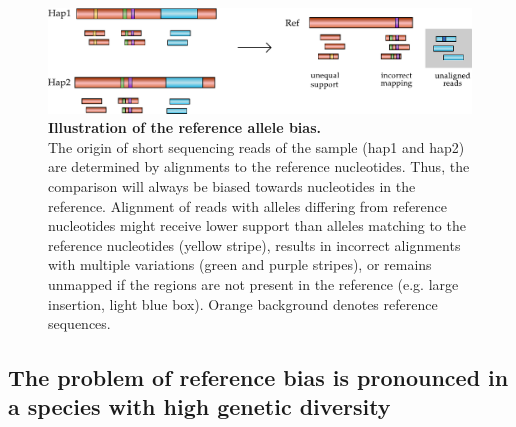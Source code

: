 \documentclass[../main.tex]{subfiles}
\begin{document}
\bigskip

\begin{figure}[!htb]
    \centering
    \includegraphics[width=\textwidth]{intro/fig2.pdf}
        \vspace{3mm}
        \caption[Illustration of the reference allele bias]{\textbf{Illustration of the reference allele bias.} \\
        \footnotesize{The origin of short sequencing reads of the sample (hap1 and hap2) are determined by alignments to the reference nucleotides. Thus, the comparison will always be biased towards nucleotides in the reference. Alignment of reads with alleles differing from reference nucleotides might receive lower support than alleles matching to the reference nucleotides (yellow stripe), results in incorrect alignments with multiple variations (green and purple stripes), or remains unmapped if the regions are not present in the reference (e.g. large insertion, light blue box). Orange background denotes reference sequences.}}
        \label{fig12:bias}
\end{figure}

\subsection*{The problem of reference bias is pronounced in a species with high genetic diversity}
\end{document}
